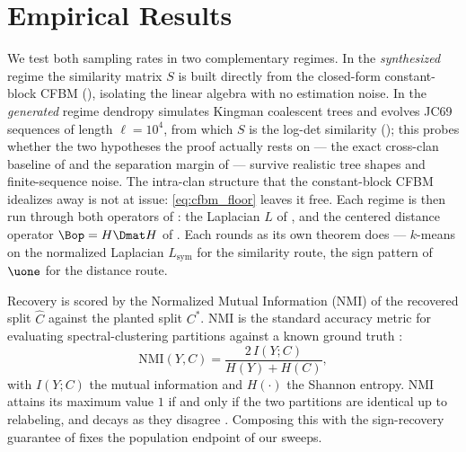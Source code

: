 \section{Empirical Results}\label{sec:empirical}

We test both sampling rates in two complementary regimes. In the \emph{synthesized} regime the similarity matrix $S$ is built directly from the closed-form constant-block CFBM (), isolating the linear algebra with no estimation noise. In the \emph{generated} regime dendropy simulates Kingman coalescent trees and evolves JC69 sequences of length $\ell=10^4$, from which $S$ is the log-det similarity (); this probes whether the two hypotheses the proof actually rests on --- the exact cross-clan baseline of  and the separation margin of  --- survive realistic tree shapes and finite-sequence noise. The intra-clan structure that the constant-block CFBM idealizes away is not at issue: \eqref{eq:cfbm_floor} leaves it free. Each regime is then run through both operators of : the Laplacian $L$ of , and the centered distance operator $\Bop=H\Dmat H$ of . Each rounds as its own theorem does --- $k$-means on the normalized Laplacian $L_{\mathrm{sym}}$ for the similarity route, the sign pattern of $\uone$ for the distance route.

Recovery is scored by the Normalized Mutual Information (NMI) of the recovered split $\hat C$ against the planted split $C^\ast$. NMI is the standard accuracy metric for evaluating spectral-clustering partitions against a known ground truth \cite{fortunato2010community, qinrohe2013regularized}:
\begin{equation}\label{eq:nmi_def}
   \mathrm{NMI}(Y,C)=\frac{2\,I(Y;C)}{H(Y)+H(C)},
\end{equation}
with $I(Y;C)$ the mutual information and $H(\cdot)$ the Shannon entropy. NMI attains its maximum value $1$ if and only if the two partitions are identical up to relabeling, and decays as they disagree \cite{strehlghosh2002cluster, fortunato2010community}. Composing this with the sign-recovery guarantee of  fixes the population endpoint of our sweeps.

